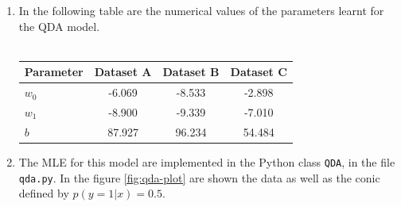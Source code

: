 \documentclass[a4paper, 11pt]{article}
\begin{document}
\begin{enumerate}[label=\alph*]
    \item In the following table are the numerical values of the parameters learnt for the QDA model. \\
    \\
        \begin{tabular}{ | l || *{3}{c| } }
             \hline
                Parameter & Dataset A & Dataset B & Dataset C \\
             \hline			
               $w_0$ & -6.069 & -8.533 & -2.898 \\
               $w_1$ & -8.900 & -9.339 & -7.010 \\
               $b$ & 87.927 & 96.234 & 54.484 \\
             \hline  
         \end{tabular}
    
    \item The MLE for this model are implemented in the Python class \texttt{QDA}, in the file \texttt{qda.py}. In the figure \ref{fig:qda-plot} are shown the data as well as the conic defined by $p \left( y=1 | x \right) = 0.5$.
    

\end{enumerate}
\end{document}
